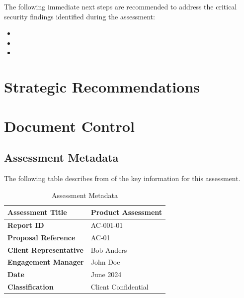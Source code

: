 \documentclass[11pt]{article}
\begin{document}
The following immediate next steps are recommended to address the critical security findings identified during the assessment:

\begin{itemize}
    \item \lipsum[9][1]
    \item \lipsum[9][2]
    \item \lipsum[9][3]
\end{itemize}

\pagebreak

\section{Strategic Recommendations}

\lipsum[10][1-8]

\lipsum[14][1-8]

\lipsum[14][1-6]

\lipsum[13][1-6]

\lipsum[12][1-5]

\lipsum[11][1-5]

\lipsum[15][1-3]

\lipsum[16][1-2]

\lipsum[16][3-4]

\pagebreak

\section{Document Control}

\subsection{Assessment Metadata}

The following table describes from of the key information for this assessment.

\begin{table}[h]
\centering
\begin{tabular}{|l|l|}
\hline
\textbf{Assessment Title} &  Product Assessment \\ \hline
\textbf{Report ID} & AC-001-01 \\ \hline
\textbf{Proposal Reference} & AC-01 \\ \hline
\textbf{Client Representative} & Bob Anders \\ \hline
\textbf{Engagement Manager} & John Doe \\ \hline
\textbf{Date} & June 2024 \\ \hline
\textbf{Classification} & Client Confidential \\ \hline
\end{tabular}
\caption{Assessment Metadata}
\end{table}
\end{document}
